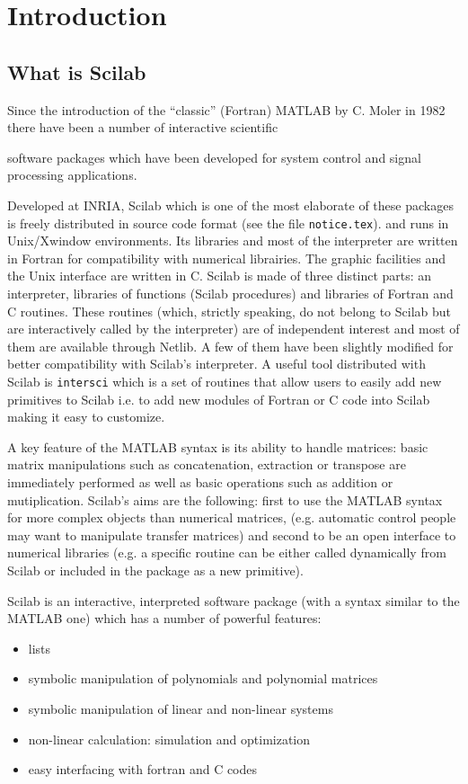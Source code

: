 \chapter{Introduction}

\section{What is Scilab}

 Since the introduction of the ``classic'' (Fortran) MATLAB 
by C. Moler in 1982 there have been a number of interactive scientific 


software 
packages which have been developed for system control and 
signal processing applications.

Developed at INRIA, Scilab which is one of the most elaborate of these packages
is freely distributed in source code format (see the file {\tt notice.tex}). 
and runs in Unix/Xwindow environments. 
Its libraries and most of the interpreter are written in Fortran for 
compatibility with numerical librairies. 
The graphic facilities and the Unix interface are written in C. 
Scilab is made of three distinct parts: an interpreter, 
libraries of functions (Scilab procedures) and libraries of Fortran 
and C routines. 
These routines (which, strictly speaking, do not belong to Scilab but
are interactively called by the interpreter) are of 
independent interest and most of them are available through Netlib. 
A few of them have been slightly modified for better compatibility
with Scilab's interpreter.
A useful tool distributed with Scilab is {\tt intersci} which
is a set of routines that allow users to easily add new primitives to
Scilab i.e. to add new modules of Fortran or C code into Scilab making
it easy to customize.
 
A key feature of the MATLAB syntax is its ability to handle matrices: 
basic matrix manipulations such as concatenation, 
extraction or transpose are immediately performed as well as basic operations
such as addition or mutiplication. 
Scilab's aims are the following: first to use the MATLAB syntax 
for more complex objects than numerical matrices,
(e.g. automatic control people may want to manipulate transfer matrices) and
second to be an open interface to numerical libraries (e.g. a specific  
routine can be either called dynamically from Scilab or included 
in the package as a new primitive). 

Scilab is an interactive, interpreted software package (with a syntax
similar to the MATLAB one) which has a number of powerful features:
%
\begin{itemize}
	\item lists
	\item symbolic manipulation of polynomials and polynomial matrices
        \item symbolic manipulation of linear and non-linear systems
	\item non-linear calculation: simulation and optimization
	\item easy interfacing with fortran and C codes
\end{itemize}
%

